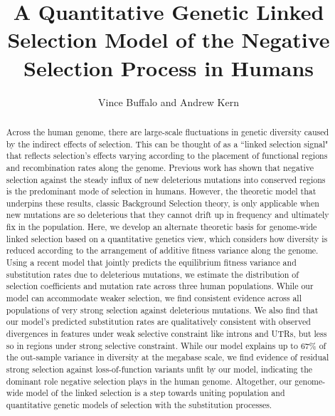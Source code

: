 \documentclass[11pt]{article}
\title{A Quantitative Genetic Linked Selection Model of the Negative Selection Process in Humans}
\author{Vince Buffalo and Andrew Kern}
\begin{document}
\maketitle



\begin{abstract}

    Across the human genome, there are large-scale fluctuations in genetic
    diversity caused by the indirect effects of selection. This can be thought
    of as a ``linked selection signal" that reflects selection's effects
    varying according to the placement of functional regions and recombination
    rates along the genome. Previous work has shown that negative selection
    against the steady influx of new deleterious mutations into conserved
    regions is the predominant mode of selection in humans. However, the
    theoretic model that underpins these results, classic Background Selection
    theory, is only applicable when new mutations are so deleterious that they
    cannot drift up in frequency and ultimately fix in the population. Here, we
    develop an alternate theoretic basis for genome-wide linked selection based
    on a quantitative genetics view, which considers how diversity is reduced
    according to the arrangement of additive fitness variance along the genome.
    Using a recent model that jointly predicts the equilibrium fitness variance
    and substitution rates due to deleterious mutations, we estimate the
    distribution of selection coefficients and mutation rate across three human
    populations. While our model can accommodate weaker selection, we find
    consistent evidence across all populations of very strong selection against
    deleterious mutations. We also find that our model's predicted substitution
    rates are qualitatively consistent with observed divergences in features
    under weak selective constraint like introns and UTRs, but less so in
    regions under strong selective constraint. While our model explains up to
    67\% of the out-sample variance in diversity at the megabase scale, we find
    evidence of residual strong selection against loss-of-function variants
    unfit by our model, indicating the dominant role negative selection plays
    in the human genome. Altogether, our genome-wide model of the linked
    selection is a step towards uniting population and quantitative genetic
    models of selection with the substitution processes.

\end{abstract}
\end{document}
